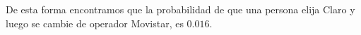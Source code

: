     De esta forma encontramos que la probabilidad de que una persona elija Claro y luego se cambie de operador Movistar, es $0.016$.
\begin{comment}
    \begin{Teo}(Ecuación de Chapman-Kolmogorov)
        Para cualquier
        par de números enteros $m$ y $n$ tales que $0\leq m\leq n$, y para cualesquiera estados $i$ y $j$ se cumple
        \begin{eqnarray}
            p_{i,j}(m,n)=\sum_k p_{i,k}(m,u)P(u,t)
        \end{eqnarray}
    \end{Teo}
\end{comment}